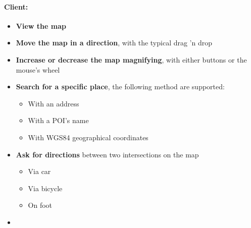 \paragraph{Client:}
\begin{itemize}
	\item \textbf{View the map}
	\item \textbf{Move the map in a direction}, with the typical drag 'n drop
	\item \textbf{Increase or decrease the map magnifying}, with either buttons 
	or the mouse's wheel
	\item \textbf{Search for a specific place}, the following method are 
	supported:
	\begin{itemize}
		\item With an address
		\item With a POI's name
		\item With WGS84 geographical coordinates
	\end{itemize}
	\item \textbf{Ask for directions} between two intersections on the map
	\begin{itemize}
		\item Via car
		\item Via bicycle
		\item On foot
	\end{itemize}
	\item 
	
\end{itemize}





